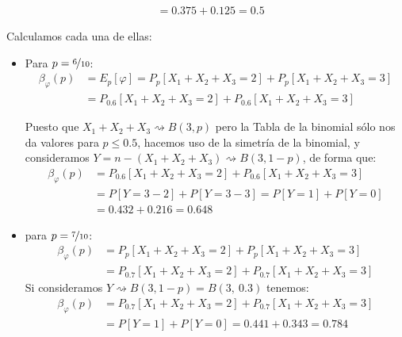 \begin{ejercicio}
\begin{description}
\begin{align*}
                                                      &= 0.375 + 0.125 = 0.5
            \end{align*}
        \item [Potencia frente a hipótesis alternativas.] 
            Calculamos cada una de ellas:
            \begin{itemize}
                \item Para $p = \nicefrac{6}{10}$:
                    \begin{align*}
                        \beta_\varphi(p) &= E_p[\varphi] = P_p[X_1 + X_2 + X_3 = 2] + P_p[X_1+X_2+X_3 = 3] \\
                                         &= P_{0.6}[X_1 + X_2 + X_3 =2] + P_{0.6}[X_1+X_2+X_3 =3]
                    \end{align*}

                    Puesto que $X_1+X_2+X_3\rightsquigarrow B(3,p)$ pero la Tabla de la binomial sólo nos da valores para $p\leq 0.5$, hacemos uso de la simetría de la binomial, y consideramos $Y=n-(X_1+X_2+X_3)\rightsquigarrow B(3,1-p)$, de forma que:
                    \begin{align*}
                        \beta_\varphi(p) &= P_{0.6}[X_1 + X_2 + X_3 =2] + P_{0.6}[X_1+X_2+X_3 =3] \\
                                         &= P[Y=3-2] + P[Y=3-3] = P[Y=1] + P[Y=0] \\
                                         &= 0.432 + 0.216 = 0.648
                    \end{align*}
                \item para $p=\nicefrac{7}{10}$:
                    \begin{align*}
                        \beta_\varphi(p) &= P_p[X_1 + X_2 + X_3 = 2] + P_p[X_1+X_2+X_3 = 3] \\
                                         &= P_{0.7}[X_1 + X_2 + X_3 =2] + P_{0.7}[X_1+X_2+X_3 =3]
                    \end{align*}
                    Si consideramos $Y\rightsquigarrow B(3,1-p) = B(3,\ 0.3)$ tenemos:
                    \begin{align*}
                        \beta_\varphi(p) &= P_{0.7}[X_1 + X_2 + X_3 =2] + P_{0.7}[X_1+X_2+X_3 =3] \\
                                         &= P[Y=1] + P[Y=0] = 0.441 + 0.343 = 0.784
                    \end{align*}
            \end{itemize}
    \end{description}
\end{ejercicio}


